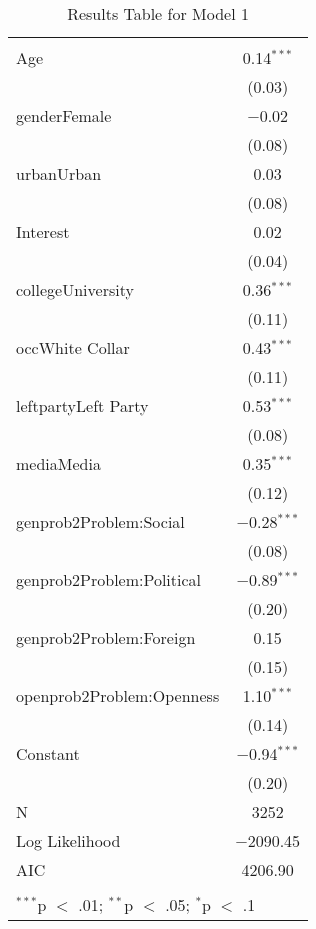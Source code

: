 
\begin{table}[!htbp] \centering 
  \caption{Results Table for Model 1} 
  \label{} 
\footnotesize 
\begin{tabular}{@{\extracolsep{5pt}}lc} 
\\[-1.8ex]\hline \\[-1.8ex] 
\hline \\[-1.8ex] 
 Age & 0.14$^{***}$ \\ 
  & (0.03) \\ 
  genderFemale & $-$0.02 \\ 
  & (0.08) \\ 
  urbanUrban & 0.03 \\ 
  & (0.08) \\ 
  Interest & 0.02 \\ 
  & (0.04) \\ 
  collegeUniversity & 0.36$^{***}$ \\ 
  & (0.11) \\ 
  occWhite Collar & 0.43$^{***}$ \\ 
  & (0.11) \\ 
  leftpartyLeft Party & 0.53$^{***}$ \\ 
  & (0.08) \\ 
  mediaMedia & 0.35$^{***}$ \\ 
  & (0.12) \\ 
  genprob2Problem:Social & $-$0.28$^{***}$ \\ 
  & (0.08) \\ 
  genprob2Problem:Political & $-$0.89$^{***}$ \\ 
  & (0.20) \\ 
  genprob2Problem:Foreign & 0.15 \\ 
  & (0.15) \\ 
  openprob2Problem:Openness & 1.10$^{***}$ \\ 
  & (0.14) \\ 
  Constant & $-$0.94$^{***}$ \\ 
  & (0.20) \\ 
 N & 3252 \\ 
Log Likelihood & $-$2090.45 \\ 
AIC & 4206.90 \\ 
\hline \\[-1.8ex] 
\multicolumn{2}{l}{$^{***}$p $<$ .01; $^{**}$p $<$ .05; $^{*}$p $<$ .1} \\ 
\end{tabular} 
\end{table} 
